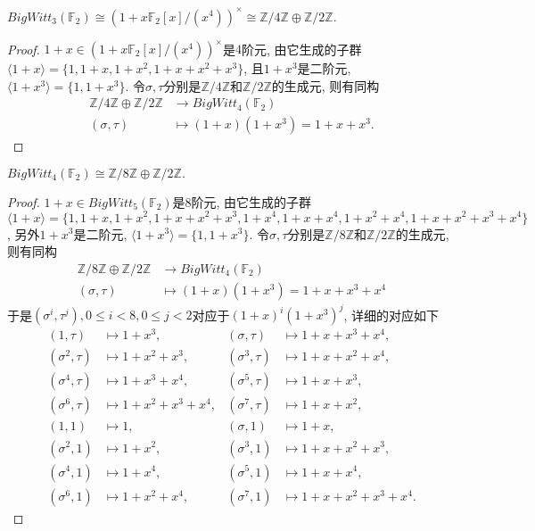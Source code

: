 \begin{example} 
\label{ex:W3(F2)}
	$BigWitt_3(\mathbb{F}_2)\cong (1+x\mathbb{F}_2[x]/(x^{4}))^{\times}\cong \mathbb{Z}/4 \mathbb{Z} \oplus\mathbb{Z}/2 \mathbb{Z}$.
\end{example}
\begin{proof}
	$1+x\in (1+x \mathbb{F}_2[x]/(x^4))^{\times}$是$4$阶元, 由它生成的子群$\langle 1+x \rangle = \{1, 1+x, 1+x^2, 1+x+x^2+x^3\}$, 且$1+x^3$是二阶元, $\langle 1+x^3 \rangle = \{1, 1+x^3\}$. 令$\sigma, \tau$分别是$\mathbb{Z}/4 \mathbb{Z}$和$\mathbb{Z}/2 \mathbb{Z}$的生成元, 则有同构
		\begin{align*}
		\mathbb{Z}/4 \mathbb{Z} \oplus \mathbb{Z}/2 \mathbb{Z} &\longrightarrow BigWitt_4(\mathbb{F}_2) \\
		(\sigma, \tau) & \mapsto (1+x)(1+x^3)=1+x+x^3. 
		\end{align*}
\end{proof}

\begin{example}
	$BigWitt_4(\mathbb{F}_2) \cong \mathbb{Z}/8 \mathbb{Z} \oplus \mathbb{Z}/2 \mathbb{Z}. $
\end{example}
\begin{proof}
	$1+x \in BigWitt_5(\mathbb{F}_2)$是$8$阶元, 由它生成的子群$\langle 1+x \rangle = \{1, 1+x, 1+x^2, 1+x+x^2+x^3, 1+x^4, 1+x+x^4, 1+x^2+x^4, 1+x+x^2+x^3+x^4\}$, 另外$1+x^3$是二阶元, $\langle 1+x^3 \rangle = \{1, 1+x^3\}$. 令$\sigma, \tau$分别是$\mathbb{Z}/8 \mathbb{Z}$和$\mathbb{Z}/2 \mathbb{Z}$的生成元, 则有同构
	\begin{align*}
	\mathbb{Z}/8 \mathbb{Z} \oplus \mathbb{Z}/2 \mathbb{Z} &\longrightarrow BigWitt_4(\mathbb{F}_2) \\
	(\sigma, \tau) & \mapsto (1+x)(1+x^3)=1+x+x^3+x^4 
	\end{align*}
	于是$(\sigma^i, \tau^j), 0\leq i <8, 0\leq j<2$对应于$(1+x)^i(1+x^3)^j$, 详细的对应如下
	\begin{align*}
	(1, \tau) & \mapsto 1+x^3, & (\sigma, \tau) & \mapsto 1+x+x^3+x^4, \\
	 (\sigma^2, \tau) & \mapsto 1+x^2+x^3, & (\sigma^3, \tau) & \mapsto 1+x+x^2+x^4, \\
	(\sigma^4, \tau) & \mapsto 1+x^3+x^4, & (\sigma^5, \tau) & \mapsto 1+x+x^3, \\
	 (\sigma^6, \tau) & \mapsto 1+x^2+x^3+x^4, & (\sigma^7, \tau) & \mapsto 1+x+x^2, \\
	(1, 1)& \mapsto 1, & (\sigma, 1) & \mapsto 1+x, \\
	(\sigma^2, 1) & \mapsto 1+x^2, & (\sigma^3, 1) & \mapsto 1+x+x^2+x^3, \\
	(\sigma^4, 1) & \mapsto 1+x^4, &
	(\sigma^5, 1) & \mapsto 1+x+x^4, \\
	(\sigma^6, 1) & \mapsto 1+x^2+x^4, & (\sigma^7, 1) & \mapsto 1+x+x^2+x^3+x^4. 
	\end{align*}
\end{proof}




